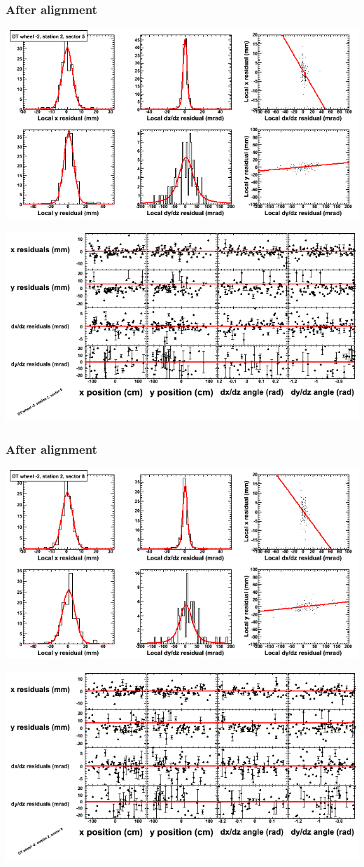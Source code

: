 \documentclass[compress]{beamer}
\begin{document}
\begin{frame}
\frametitle{After alignment}
\includegraphics[width=0.7\linewidth]{NOV4_fitfunctions/MBwhAst2sec05_bellcurves.png}

\includegraphics[width=0.7\linewidth]{NOV4_fitfunctions/MBwhAst2sec05_polynomials.png}
\end{frame}

\begin{frame}
\frametitle{After alignment}
\includegraphics[width=0.7\linewidth]{NOV4_fitfunctions/MBwhAst2sec08_bellcurves.png}

\includegraphics[width=0.7\linewidth]{NOV4_fitfunctions/MBwhAst2sec08_polynomials.png}
\end{frame}
\end{document}
